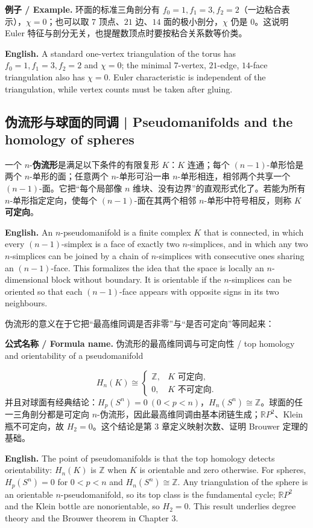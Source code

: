 \documentclass[UTF8,11pt,a4paper]{ctexart}
\newcommand{\EN}[1]{\par\noindent\textbf{English.} #1\par}
\newcommand{\FORMULA}[2]{\par\noindent\textbf{公式名称 / Formula name.} #1 / #2\par}
\newcommand{\EX}[2]{\par\noindent\textbf{例子 / Example.} #1\par\EN{#2}}
\begin{document}
\EX{环面的标准三角剖分有 $f_0=1,f_1=3,f_2=2$（一边粘合表示），$\chi=0$；也可以取 $7$ 顶点、$21$ 边、$14$ 面的极小剖分，$\chi$ 仍是 $0$。这说明 Euler 特征与剖分无关，也提醒数顶点时要按粘合关系数等价类。}{A standard one-vertex triangulation of the torus has $f_0=1,f_1=3,f_2=2$ and $\chi=0$; the minimal $7$-vertex, $21$-edge, $14$-face triangulation also has $\chi=0$. Euler characteristic is independent of the triangulation, while vertex counts must be taken after gluing.}

\subsection{伪流形与球面的同调 | Pseudomanifolds and the homology of spheres}
\noindent 一个 $n$-\textbf{伪流形}是满足以下条件的有限复形 $K$：$K$ 连通；每个 $(n-1)$-单形恰是两个 $n$-单形的面；任意两个 $n$-单形可沿一串 $n$-单形相连，相邻两个共享一个 $(n-1)$-面。它把“每个局部像 $n$ 维块、没有边界”的直观形式化了。若能为所有 $n$-单形指定定向，使每个 $(n-1)$-面在其两个相邻 $n$-单形中符号相反，则称 $K$ \textbf{可定向}。
\EN{An $n$-pseudomanifold is a finite complex $K$ that is connected, in which every $(n-1)$-simplex is a face of exactly two $n$-simplices, and in which any two $n$-simplices can be joined by a chain of $n$-simplices with consecutive ones sharing an $(n-1)$-face. This formalizes the idea that the space is locally an $n$-dimensional block without boundary. It is orientable if the $n$-simplices can be oriented so that each $(n-1)$-face appears with opposite signs in its two neighbours.}

\noindent 伪流形的意义在于它把“最高维同调是否非零”与“是否可定向”等同起来：
\FORMULA{伪流形的最高维同调与可定向性}{top homology and orientability of a pseudomanifold}
\[
H_n(K)\cong
\begin{cases}
\mathbb Z,&K\text{ 可定向},\\
0,&K\text{ 不可定向}.
\end{cases}
\]
并且对球面有经典结论：$H_p(S^n)=0\ (0<p<n)$，$H_n(S^n)\cong\mathbb Z$。球面的任一三角剖分都是可定向 $n$-伪流形，因此最高维同调由基本闭链生成；$\mathbb R P^2$、Klein 瓶不可定向，故 $H_2=0$。这个结论是第 3 章定义映射次数、证明 Brouwer 定理的基础。
\EN{The point of pseudomanifolds is that the top homology detects orientability: $H_n(K)$ is $\mathbb Z$ when $K$ is orientable and zero otherwise. For spheres, $H_p(S^n)=0$ for $0<p<n$ and $H_n(S^n)\cong\mathbb Z$. Any triangulation of the sphere is an orientable $n$-pseudomanifold, so its top class is the fundamental cycle; $\mathbb R P^2$ and the Klein bottle are nonorientable, so $H_2=0$. This result underlies degree theory and the Brouwer theorem in Chapter 3.}
\end{document}
